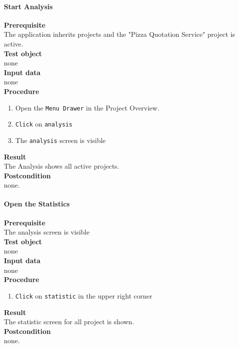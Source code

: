 \paragraph*{\textbf{Start Analysis}}
\textbf{Prerequisite}\\
The application inherits projects and the "Pizza Quotation Service" project is active.\\
\textbf{Test object}\\
none\\
\textbf{Input data}\\
none\\
\textbf{Procedure}
\begin{enumerate}
	\item Open the \texttt{Menu Drawer} in the Project Overview.
	\item \texttt{Click} on \texttt{analysis}
	\item The \texttt{analysis} screen is visible
\end{enumerate}
\textbf{Result}\\
The Analysis shows all active projects.\\
\textbf{Postcondition}\\
none.
\paragraph*{\textbf{Open the Statistics}}
\textbf{Prerequisite}\\
The analysis screen is visible\\
\textbf{Test object}\\
none\\
\textbf{Input data}\\
none\\
\textbf{Procedure}
\begin{enumerate}
	\item \texttt{Click} on \texttt{statistic} in the upper right corner
\end{enumerate}
\textbf{Result}\\
The statistic screen for all project is shown.\\
\textbf{Postcondition}\\
none.